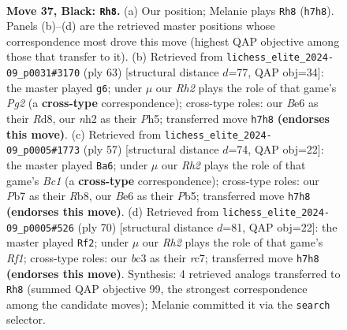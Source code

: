 \documentclass[11pt]{article}
\begin{document}
\clearpage

\begin{figure}[p]\centering
\begin{subfigure}{0.46\textwidth}\centering
\resizebox{\linewidth}{!}{%
\newchessgame
\chessboard[
  setfen={1k6/rp2b1pr/p1p1b2p/P4p2/R1pP3P/2B1P1P1/1P3P1N/2K4R b - - 2 37},
  showmover=false,
  pgfstyle=straightmove, color=movearrow, markmove={h7-h8}
]}
\caption{}
\end{subfigure}\hfill
\begin{subfigure}{0.46\textwidth}\centering
\resizebox{\linewidth}{!}{%
\newchessgame
\chessboard[
  setfen={3r1k2/1b2r1p1/p7/P3pp1p/2Bp4/3P1P1P/1PPR2P1/5RK1 b - - 0 32},
  showmover=false,
  pgfstyle=straightmove, color=movearrow, markmove={g7-g6}
]}
\caption{}
\end{subfigure}
\\[4pt]
\begin{subfigure}{0.46\textwidth}\centering
\resizebox{\linewidth}{!}{%
\newchessgame
\chessboard[
  setfen={1rb5/4kp2/4p1pp/pp6/2p1PbPP/P4P2/1P2B3/1K3N1R b - - 1 29},
  showmover=false,
  pgfstyle=straightmove, color=movearrow, markmove={c8-a6}
]}
\caption{}
\end{subfigure}\hfill
\begin{subfigure}{0.46\textwidth}\centering
\resizebox{\linewidth}{!}{%
\newchessgame
\chessboard[
  setfen={7r/1kr2p2/2b1p1p1/1p1pP2p/pP1R1P2/P1P1K1P1/4B2P/5R2 w - - 11 36},
  showmover=false,
  pgfstyle=straightmove, color=movearrow, markmove={f1-f2}
]}
\caption{}
\end{subfigure}
\caption{\textbf{Move 37, Black: \texttt{Rh8}.} (a) Our position; Melanie plays \texttt{Rh8} (\texttt{h7h8}). Panels (b)--(d) are the retrieved master positions whose correspondence most drove this move (highest QAP objective among those that transfer to it). (b) Retrieved from \texttt{lichess\_elite\_2024-09\_p0031\#3170} (ply 63) [structural distance $d$=77, QAP obj=34]: the master played \texttt{g6}; under $\mu$ our \emph{Rh2} plays the role of that game's \emph{Pg2} (a \textbf{cross-type} correspondence); cross-type roles: our \emph{B}e6 as their \emph{R}d8, our \emph{n}h2 as their \emph{P}h5; transferred move \texttt{h7h8} \textbf{(endorses this move)}. (c) Retrieved from \texttt{lichess\_elite\_2024-09\_p0005\#1773} (ply 57) [structural distance $d$=74, QAP obj=22]: the master played \texttt{Ba6}; under $\mu$ our \emph{Rh2} plays the role of that game's \emph{Bc1} (a \textbf{cross-type} correspondence); cross-type roles: our \emph{P}b7 as their \emph{R}b8, our \emph{B}e6 as their \emph{P}b5; transferred move \texttt{h7h8} \textbf{(endorses this move)}. (d) Retrieved from \texttt{lichess\_elite\_2024-09\_p0005\#526} (ply 70) [structural distance $d$=81, QAP obj=22]: the master played \texttt{Rf2}; under $\mu$ our \emph{Rh2} plays the role of that game's \emph{Rf1}; cross-type roles: our \emph{b}c3 as their \emph{r}c7; transferred move \texttt{h7h8} \textbf{(endorses this move)}. Synthesis: 4 retrieved analogs transferred to \texttt{Rh8} (summed QAP objective 99, the strongest correspondence among the candidate moves); Melanie committed it via the \texttt{search} selector.}
\label{fig:thought-m73}
\end{figure}
\end{document}

